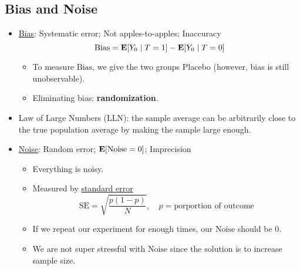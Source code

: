 \documentclass[10pt, letterpaper]{article}
\def\E{\vb E}
\def\Bias{\mathrm{Bias}}
\def\SE{\mathrm{SE}}
\begin{document}
\begin{multicols}{2}
\section*{Bias and Noise}
\begin{itemize}
	\item \underline{Bias}: Systematic error; Not apples-to-apples; Inaccuracy \[\Bias=\E[Y_0\mid T=1]-\E[Y_0\mid T=0]\]
	\begin{itemize}
		\item To measure $\Bias$, we give the two groups Placebo (however, bias is still unobservable). 
		\item Eliminating bias: \textbf{randomization}.
	\end{itemize}
	\item Law of Large Numbers (LLN): the sample average can be arbitrarily close to the true population average by making the sample large enough. 
	\item \underline{Noise}: Random error; $\E\qty[\mathrm{Noise}=0]$; Imprecision
	\begin{itemize}
		\item Everything is noisy.
		\item Measured by \underline{standard error} \[\SE=\sqrt{\frac{p(1-p)}{N}},\quad p=\text{porportion of outcome}\]
		\item If we repeat our experiment for enough times, our $\mathrm{Noise}$ should be $0$.
		\item We are not super stressful with $\mathrm{Noise}$ since the solution is to increase sample size. 
	\end{itemize}
\end{itemize}


\end{multicols}
\end{document}
